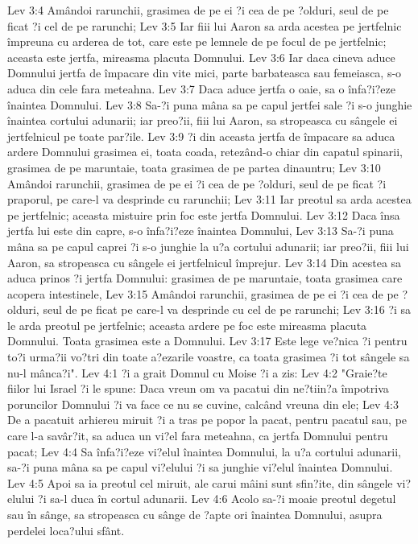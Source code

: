 Lev 3:4  Amândoi rarunchii, grasimea de pe ei ?i cea de pe ?olduri, seul de pe ficat ?i cel de pe rarunchi;
Lev 3:5  Iar fiii lui Aaron sa arda acestea pe jertfelnic împreuna cu arderea de tot, care este pe lemnele de pe focul de pe jertfelnic; aceasta este jertfa, mireasma placuta Domnului.
Lev 3:6  Iar daca cineva aduce Domnului jertfa de împacare din vite mici, parte barbateasca sau femeiasca, s-o aduca din cele fara meteahna.
Lev 3:7  Daca aduce jertfa o oaie, sa o înfa?i?eze înaintea Domnului.
Lev 3:8  Sa-?i puna mâna sa pe capul jertfei sale ?i s-o junghie înaintea cortului adunarii; iar preo?ii, fiii lui Aaron, sa stropeasca cu sângele ei jertfelnicul pe toate par?ile.
Lev 3:9  ?i din aceasta jertfa de împacare sa aduca ardere Domnului grasimea ei, toata coada, retezând-o chiar din capatul spinarii, grasimea de pe maruntaie, toata grasimea de pe partea dinauntru;
Lev 3:10  Amândoi rarunchii, grasimea de pe ei ?i cea de pe ?olduri, seul de pe ficat ?i praporul, pe care-l va desprinde cu rarunchii;
Lev 3:11  Iar preotul sa arda acestea pe jertfelnic; aceasta mistuire prin foc este jertfa Domnului.
Lev 3:12  Daca însa jertfa lui este din capre, s-o înfa?i?eze înaintea Domnului,
Lev 3:13  Sa-?i puna mâna sa pe capul caprei ?i s-o junghie la u?a cortului adunarii; iar preo?ii, fiii lui Aaron, sa stropeasca cu sângele ei jertfelnicul împrejur.
Lev 3:14  Din acestea sa aduca prinos ?i jertfa Domnului: grasimea de pe maruntaie, toata grasimea care acopera intestinele,
Lev 3:15  Amândoi rarunchii, grasimea de pe ei ?i cea de pe ?olduri, seul de pe ficat pe care-l va desprinde cu cel de pe rarunchi;
Lev 3:16  ?i sa le arda preotul pe jertfelnic; aceasta ardere pe foc este mireasma placuta Domnului. Toata grasimea este a Domnului.
Lev 3:17  Este lege ve?nica ?i pentru to?i urma?ii vo?tri din toate a?ezarile voastre, ca toata grasimea ?i tot sângele sa nu-l mânca?i".
Lev 4:1  ?i a grait Domnul cu Moise ?i a zis:
Lev 4:2  "Graie?te fiilor lui Israel ?i le spune: Daca vreun om va pacatui din ne?tiin?a împotriva poruncilor Domnului ?i va face ce nu se cuvine, calcând vreuna din ele;
Lev 4:3  De a pacatuit arhiereu miruit ?i a tras pe popor la pacat, pentru pacatul sau, pe care l-a savâr?it, sa aduca un vi?el fara meteahna, ca jertfa Domnului pentru pacat;
Lev 4:4  Sa înfa?i?eze vi?elul înaintea Domnului, la u?a cortului adunarii, sa-?i puna mâna sa pe capul vi?elului ?i sa junghie vi?elul înaintea Domnului.
Lev 4:5  Apoi sa ia preotul cel miruit, ale carui mâini sunt sfin?ite, din sângele vi?elului ?i sa-l duca în cortul adunarii.
Lev 4:6  Acolo sa-?i moaie preotul degetul sau în sânge, sa stropeasca cu sânge de ?apte ori înaintea Domnului, asupra perdelei loca?ului sfânt.
